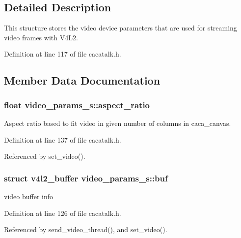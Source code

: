 \subsection{\-Detailed \-Description}
\-This structure stores the video device parameters that are used for streaming video frames with \-V4\-L2. 

\-Definition at line 117 of file cacatalk.\-h.



\subsection{\-Member \-Data \-Documentation}
\hypertarget{structvideo__params__s_a1b7019b0aa1838ed55f41cd299cd7fb3}{
\subsubsection[{aspect\-\_\-ratio}]{\setlength{\rightskip}{0pt plus 5cm}float {\bf video\-\_\-params\-\_\-s\-::aspect\-\_\-ratio}}}\label{structvideo__params__s_a1b7019b0aa1838ed55f41cd299cd7fb3}


\-Aspect ratio based to fit video in given number of columns in caca\-\_\-canvas. 



\-Definition at line 137 of file cacatalk.\-h.



\-Referenced by set\-\_\-video().

\hypertarget{structvideo__params__s_ac6db9e27abcbbf76acd19e7eb0b946b2}{
\subsubsection[{buf}]{\setlength{\rightskip}{0pt plus 5cm}struct v4l2\-\_\-buffer {\bf video\-\_\-params\-\_\-s\-::buf}}}\label{structvideo__params__s_ac6db9e27abcbbf76acd19e7eb0b946b2}


video buffer info 



\-Definition at line 126 of file cacatalk.\-h.



\-Referenced by send\-\_\-video\-\_\-thread(), and set\-\_\-video().

